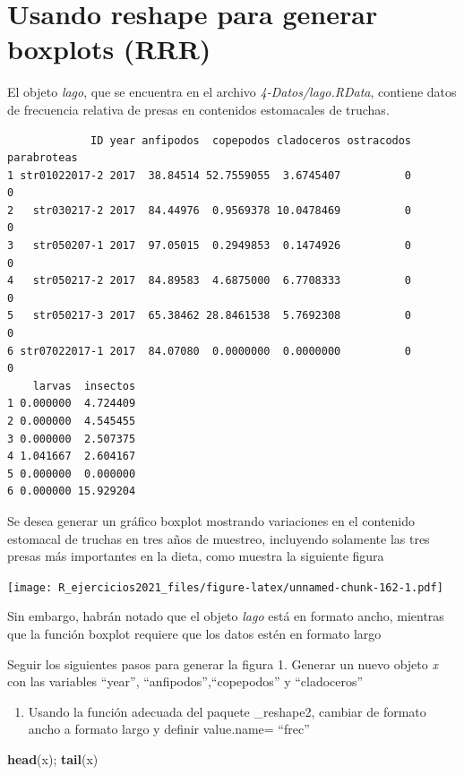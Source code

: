 \documentclass[]{book}
\newenvironment{Shaded}{\begin{snugshade}}{\end{snugshade}}
\newcommand{\KeywordTok}[1]{\textcolor[rgb]{0.13,0.29,0.53}{\textbf{#1}}}
\newcommand{\NormalTok}[1]{#1}
\providecommand{\tightlist}{%
  \setlength{\itemsep}{0pt}\setlength{\parskip}{0pt}}
\begin{document}
\hypertarget{usando-reshape-para-generar-boxplots-rrr}{%
\section{Usando reshape para generar boxplots (RRR)}\label{usando-reshape-para-generar-boxplots-rrr}}

El objeto \emph{lago}, que se encuentra en el archivo \emph{4-Datos/lago.RData}, contiene datos de frecuencia relativa de presas en contenidos estomacales de truchas.

\begin{verbatim}
             ID year anfipodos  copepodos cladoceros ostracodos parabroteas
1 str01022017-2 2017  38.84514 52.7559055  3.6745407          0           0
2   str030217-2 2017  84.44976  0.9569378 10.0478469          0           0
3   str050207-1 2017  97.05015  0.2949853  0.1474926          0           0
4   str050217-2 2017  84.89583  4.6875000  6.7708333          0           0
5   str050217-3 2017  65.38462 28.8461538  5.7692308          0           0
6 str07022017-1 2017  84.07080  0.0000000  0.0000000          0           0
    larvas  insectos
1 0.000000  4.724409
2 0.000000  4.545455
3 0.000000  2.507375
4 1.041667  2.604167
5 0.000000  0.000000
6 0.000000 15.929204
\end{verbatim}

Se desea generar un gráfico boxplot mostrando variaciones en el contenido estomacal de truchas en tres años de muestreo, incluyendo solamente las tres presas más importantes en la dieta, como muestra la siguiente figura

\texttt{[image: R\_ejercicios2021\_files/figure-latex/unnamed-chunk-162-1.pdf]}

Sin embargo, habrán notado que el objeto \emph{lago} está en formato ancho, mientras que la función boxplot requiere que los datos estén en formato largo

Seguir los siguientes pasos para generar la figura
1. Generar un nuevo objeto \emph{x} con las variables ``year'', ``anfipodos'',``copepodos'' y ``cladoceros''

\begin{enumerate}
\def\labelenumi{\arabic{enumi}.}
\setcounter{enumi}{1}
\tightlist
\item
  Usando la función adecuada del paquete \_reshape2, cambiar de formato ancho a formato largo y definir value.name= ``frec''
\end{enumerate}

\begin{Shaded}
\begin{Highlighting}[]
\KeywordTok{head}\NormalTok{(x); }\KeywordTok{tail}\NormalTok{(x)}
\end{Highlighting}
\end{Shaded}
\end{document}
